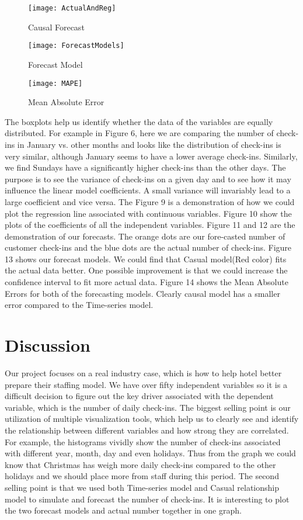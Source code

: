 \documentclass{article}
\begin{document}
\begin{figure}[!htbp]
  \centering
    \texttt{[image: ActualAndReg]}
  \caption{Causal Forecast}
\end{figure}

\begin{figure}[!htbp]
  \centering
    \texttt{[image: ForecastModels]}
  \caption{Forecast Model}
\end{figure}

\begin{figure}[!htbp]
  \centering
    \texttt{[image: MAPE]}
  \caption{Mean Absolute Error}
\end{figure}

The boxplots help us identify whether the data of the variables are equally distributed. For example in Figure 6, here we are comparing the number of check-ins in January vs. other months and looks like the distribution of check-ins is very similar, although January seems to have a lower average check-ins. Similarly, we find Sundays have a significantly higher check-ins than the other days. The purpose is to see the variance of check-ins on a given day and to see how it may influence the linear model coefficients. A small variance will invariably lead to a large coefficient and vice versa.
The Figure 9 is a demonstration of how we could plot the regression line associated with continuous variables.
Figure 10 show the plots of the coefficients of all the independent variables.
Figure 11 and 12 are the demonstration of our forecasts. The orange dots are our fore-casted number of customer check-ins and the blue dots are the actual number of check-ins.
Figure 13 shows our forecast models. We could find that Casual model(Red color) fits the actual data better. One possible improvement is that we could increase the confidence interval to fit more actual data. 
Figure 14 shows the Mean Absolute Errors for both of the forecasting models. Clearly causal model has a smaller error compared to the Time-series model.

\section{Discussion}

Our project focuses on a real industry case, which is how to help hotel better prepare their staffing model. We have over fifty independent variables so it is a difficult decision to figure out the key driver associated with the dependent variable, which is the number of daily check-ins. The biggest selling point is our utilization of multiple visualization tools, which help us to clearly see and identify the relationship between different variables and how strong they are correlated. For example, the histograms vividly show the number of check-ins associated with different year, month, day and even holidays. Thus from the graph we could know that Christmas has weigh more daily check-ins compared to the other holidays and we should place more from staff during this period. The second selling point is that we used both Time-series model and Casual relationship model to simulate and forecast the number of check-ins. It is interesting to plot the two forecast models and actual number together in one graph.
\end{document}
